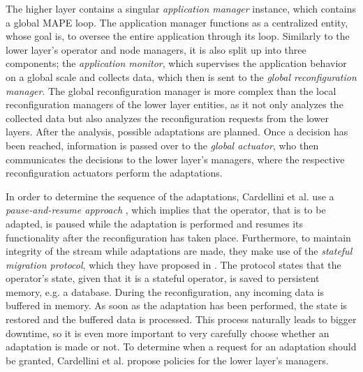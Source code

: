        \quad The higher layer contains a singular \textit{application manager} instance, which contains a global MAPE loop.
        The application manager functions as a centralized entity, whose goal is, to oversee the entire application through its loop.
        Similarly to the lower layer's operator and node managers, it is also split up into three components;
        the \textit{application monitor}, which supervises the application behavior on a global scale and collects data, which then is sent to the \textit{global reconfiguration manager}.
        The global reconfiguration manager is more complex than the local reconfiguration managers of the lower layer entities, as it not only analyzes the collected data but 
        also analyzes the reconfiguration requests from the lower layers. After the analysis, possible adaptations are planned.
        Once a decision has been reached, information is passed over to the \textit{global actuator}, who then communicates the decisions to the lower layer's managers, 
        where the respective reconfiguration actuators perform the adaptations.
        
        \quad In order to determine the sequence of the adaptations, Cardellini et al. use a \textit{pause-and-resume approach} \cite{Heinze2014CloudbasedDS}, 
        which implies that the operator, that is to be adapted, is paused while the adaptation is performed and resumes its functionality after the 
        reconfiguration has taken place. 
        Furthermore, to maintain integrity of the stream while adaptations are made, they make use of the \textit{stateful migration protocol}, 
        which they have proposed in \cite{migrationProtocol}. The protocol states that the operator's state, given that it is a stateful operator, 
        is saved to persistent memory, e.g. a database. During the reconfiguration, any incoming data is buffered in memory.
        As soon as the adaptation has been performed, the state is restored and the buffered data is processed.
        This process naturally leads to bigger downtime, so it is even more important to very carefully choose whether an adaptation is made or not.
        To determine when a request for an adaptation should be granted, Cardellini et al. propose policies for the lower layer's managers.

